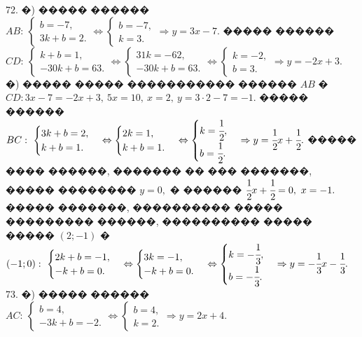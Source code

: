 \documentclass[12pt]{article}
\begin{document}
72. �) ����� ������ $AB:\ \begin{cases} b=-7,\\ 3k+b=2.\end{cases}\Leftrightarrow\begin{cases} b=-7,\\ k=3.\end{cases}\Rightarrow y=3x-7.$
����� ������ $CD:\ \begin{cases} k+b=1,\\ -30k+b=63.\end{cases}\Leftrightarrow\begin{cases} 31k=-62,\\ -30k+b=63.\end{cases}
\Leftrightarrow\begin{cases} k=-2,\\ b=3.\end{cases}\Rightarrow y=-2x+3.$\\
�) ����� ����� ����������� ������ $AB$ � $CD: 3x-7=-2x+3,\ 5x=10,\ x=2,\ y=3\cdot2-7=-1.$ ����� ������ $BC:\ \begin{cases} 3k+b=2,\\ k+b=1.\end{cases}\Leftrightarrow\begin{cases} 2k=1,\\ k+b=1.\end{cases}\Leftrightarrow\begin{cases} k=\cfrac{1}{2},\\ b=\cfrac{1}{2}.\end{cases}\Rightarrow y=\cfrac{1}{2}x+\cfrac{1}{2}.$ ����� ���� ������, ������� �� ��� �������, ����� �������� $y=0,$ � ������ $\cfrac{1}{2}x+\cfrac{1}{2}=0,\ x=-1.$ ����� �������, ���������� ����� ��������� ������, ���������� ����� ����� $(2;-1)$ � $(-1;0): \ \begin{cases} 2k+b=-1,\\ -k+b=0.\end{cases}\Leftrightarrow\begin{cases} 3k=-1,\\ -k+b=0.\end{cases}\Leftrightarrow\begin{cases} k=-\cfrac{1}{3},\\ b=-\cfrac{1}{3}.\end{cases}\Rightarrow y=-\cfrac{1}{3}x-\cfrac{1}{3}.$\\
73. �) ����� ������ $AC:\ \begin{cases} b=4,\\ -3k+b=-2.\end{cases}\Leftrightarrow\begin{cases} b=4,\\ k=2.\end{cases}\Rightarrow y=2x+4.$
\end{document}
